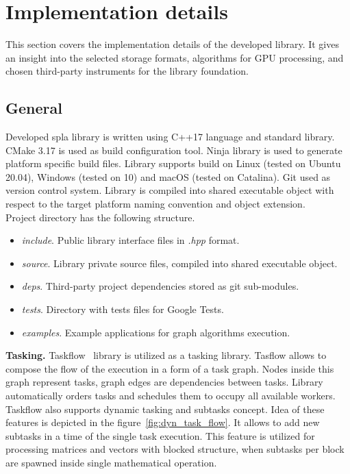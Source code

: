 \section{Implementation details}

This section covers the implementation details of the developed library. It gives an insight into the selected storage formats, algorithms for GPU processing, and chosen third-party instruments for the library foundation.

\subsection{General}

Developed spla library is written using C++17 language and standard library. CMake 3.17 is used as build configuration tool. Ninja library is used to generate platform specific build files. Library supports build on Linux (tested on Ubuntu 20.04), Windows (tested on 10) and macOS (tested on Catalina). Git used as version control system. Library is compiled into shared executable object with respect to the target platform naming convention and object extension.\\

Project directory has the following structure.

\begin{itemize}[noitemsep,topsep=0pt,parsep=0pt,partopsep=0pt]
    \item \textit{include}. Public library interface files in \textit{.hpp} format. 
    \item \textit{source}. Library private source files, compiled into shared executable object.
    \item \textit{deps}. Third-party project dependencies stored as git sub-modules. 
    \item \textit{tests}. Directory with tests files for Google Tests.
    \item \textit{examples}. Example applications for graph algorithms execution.\\
\end{itemize}

\textbf{Tasking.} Taskflow~\cite{Huang2022TaskflowAL} library is utilized as a tasking library. Tasflow allows to compose the flow of the execution in a form of a task graph. Nodes inside this graph represent tasks, graph edges are dependencies between tasks. Library automatically orders tasks and schedules them to occupy all available workers. Taskflow also supports dynamic tasking and subtasks concept. Idea of these features is depicted in the figure~\ref{fig:dyn_task_flow}. It allows to add new subtasks in a time of the single task execution. This feature is utilized for processing matrices and vectors with blocked structure, when subtasks per block are spawned inside single mathematical operation.\\

